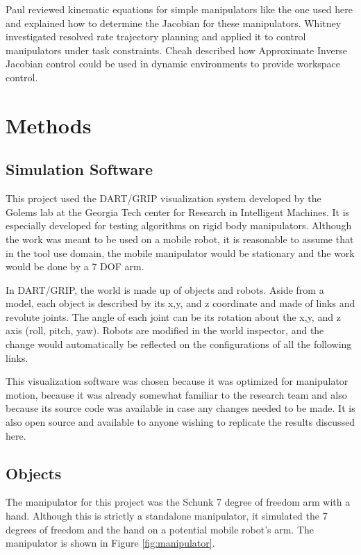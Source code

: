 \documentclass[10pt, conference]{IEEEtran}
\begin{document}
  Paul reviewed kinematic equations for simple manipulators like the one
  used here and explained how to determine the Jacobian for these
  manipulators.\cite{paul} Whitney investigated resolved rate trajectory
  planning and applied it to control manipulators under task
  constraints.\cite{whitney} Cheah described how Approximate Inverse
  Jacobian control could be used in dynamic environments to provide
  workspace control.\cite{cheah}
\section{Methods}
\label{sec-3}
\subsection{Simulation Software}
\label{sec-3-1}

   This project used the DART/GRIP visualization system developed by the
   Golems lab at the Georgia Tech center for Research in Intelligent
   Machines. It is especially developed for testing algorithms on rigid
   body manipulators. Although the work was meant to be used on a mobile
   robot, it is reasonable to assume that in the tool use domain, the
   mobile manipulator would be stationary and the work would be done by
   a 7 DOF arm.

   In DART/GRIP, the world is made up of objects and robots. Aside from
   a model, each object is described by its x,y, and z coordinate and
   made of links and revolute joints. The angle of each joint can be
   its rotation about the x,y, and z axis (roll, pitch, yaw). Robots are
   modified in the world inspector, and the change would automatically
   be reflected on the configurations of all the following links.

   This visualization software was chosen because it was optimized for
   manipulator motion, because it was already somewhat familiar to the
   research team and also because its source code was available in case
   any changes needed to be made. It is also open source and available
   to anyone wishing to replicate the results discussed here.
\subsection{Objects}
\label{sec-3-2}

   The manipulator for this project was the Schunk 7 degree of freedom
   arm with a hand. Although this is strictly a standalone manipulator,
   it simulated the 7 degrees of freedom and the hand on a potential
   mobile robot’s arm. The manipulator is shown in Figure \ref{fig:manipulator}.
\end{document}
